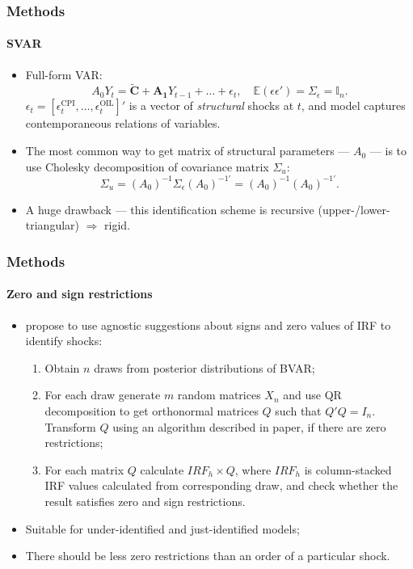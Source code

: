 \documentclass{beamer}
\begin{document}
\begin{frame}
		\frametitle{Methods}
	\framesubtitle{SVAR}
	\begin{itemize}
		\item Full-form VAR:
		\begin{equation}
			A_0{Y}_t = \tilde{\mathbf{C}} + \mathbf{A_1} Y_{t-1} + \ldots + \epsilon_t, \quad \mathbb{E}(\epsilon \epsilon') = \Sigma_\epsilon = \mathbb{I}_n.
		\end{equation}
		$\epsilon_t = \left[\epsilon^{\text{CPI}}_t, \ldots, \epsilon^{\text{OIL}}_t\right]'$ is a vector of \textit{structural} shocks at $t$, and model captures contemporaneous relations of variables.
		\item The most common way to get matrix of structural parameters --- $A_0$ --- is to use Cholesky decomposition of covariance matrix $\Sigma_u$:
		\begin{equation}
			\Sigma_u = (A_0)^{-1} \Sigma_\epsilon (A_0)^{-1'} = (A_0)^{-1} (A_0)^{-1'}.
		\end{equation}
		\item A huge drawback --- this identification scheme is recursive (upper-/lower-triangular) $\Rightarrow$ rigid.
	\end{itemize}
\end{frame}

\begin{frame}
	\frametitle{Methods}
	\framesubtitle{Zero and sign restrictions}
	\begin{itemize}
	\item \parencite{Arias2014} propose to use agnostic suggestions about signs and zero values of IRF to identify shocks:
	\begin{enumerate}
		\item Obtain $n$ draws from posterior distributions of BVAR;
		\item For each draw generate $m$ random matrices $X_n$ and use QR decomposition to get orthonormal matrices $Q$ such that $Q'Q = I_n$. Transform $Q$ using an algorithm described in paper, if there are zero restrictions;
		\item For each matrix $Q$ calculate $IRF_h \times Q$, where $IRF_h$ is column-stacked IRF values calculated from corresponding draw, and check whether the result satisfies zero and sign restrictions. 
	\end{enumerate}
	\item Suitable for under-identified and just-identified models;
	\item There should be less zero restrictions than an order of a particular shock.
	\end{itemize}
\end{frame}
\end{document}
